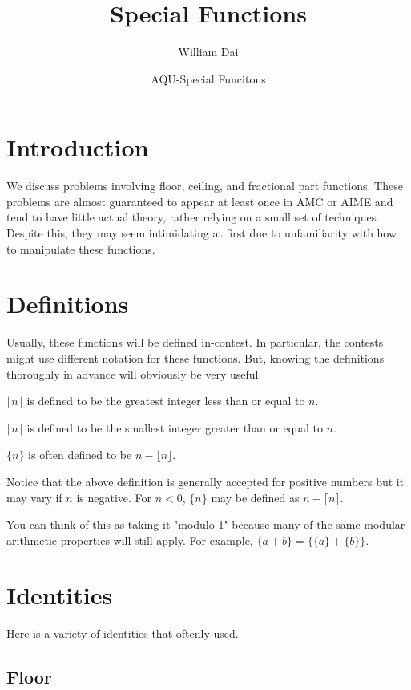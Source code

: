 \documentclass{article}
\title{Special Functions}
\author{William Dai}
\date{AQU-Special Funcitons}
\begin{document}
\maketitle

\section{Introduction}
We discuss problems involving floor, ceiling, and fractional part functions. These problems are almost guaranteed to appear at least once in AMC or AIME and tend to have little actual theory, rather relying on a small set of techniques. Despite this, they may seem intimidating at first due to unfamiliarity with how to manipulate these functions.

\newpage
\section{Definitions}
Usually, these functions will be defined in-contest. In particular, the contests might use different notation for these functions. But, knowing the definitions thoroughly in advance will obviously be very useful.

\begin{defi}[Floor]
$\lfloor n \rfloor$ is defined to be the greatest integer less than or equal to $n$.
\end{defi}

\begin{defi}[Ceiling]
$\lceil n \rceil$ is defined to be the smallest integer greater than or equal to $n$.
\end{defi}

\begin{defi}
$\{ n \}$ is often defined to be $n-\lfloor n \rfloor$.
\end{defi}
Notice that the above definition is generally accepted for positive numbers but it may vary if $n$ is negative. For $n<0$, $\{ n \}$ may be defined as $n-\lceil n \rceil$.

You can think of this as taking it "modulo 1" because many of the same modular arithmetic properties will still apply. For example, $\{a+b\}=\{\{a\}+\{b\}\}$.

\newpage
\section{Identities}
Here is a variety of identities that oftenly used.
\subsection{Floor}
\end{document}
